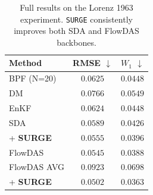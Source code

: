 \documentclass{article}
\theoremstyle{plain}
\theoremstyle{definition}
\theoremstyle{remark}
\begin{document}
\begin{table}[t]
\caption{Full results on the Lorenz 1963 experiment. \texttt{SURGE} consistently improves both SDA and FlowDAS backbones.}
\label{tab:lorenz_full}
\begin{center}
\begin{small}
\begin{sc}
\begin{tabular}{lcc}
\toprule
Method & RMSE $\downarrow$ & $W_1$ $\downarrow$\\
\midrule
BPF (N=20)              & $0.0625$ & $0.0448$ \\
DM                      & $0.0766$ & $0.0549$ \\
EnKF                    & $0.0624$ & $0.0448$ \\
SDA                     & $0.0589$ & $0.0426$ \\
\quad + \textbf{SURGE}  & $0.0555$ & $0.0396$ \\
FlowDAS                 & $0.0545$ & $0.0388$ \\
FlowDAS AVG             & $0.0923$ & $0.0698$ \\
\quad + \textbf{SURGE}  & $\mathbf{0.0502}$ & $\mathbf{0.0363}$ \\
\bottomrule
\end{tabular}
\end{sc}
\end{small}
\end{center}
\end{table}
\end{document}
